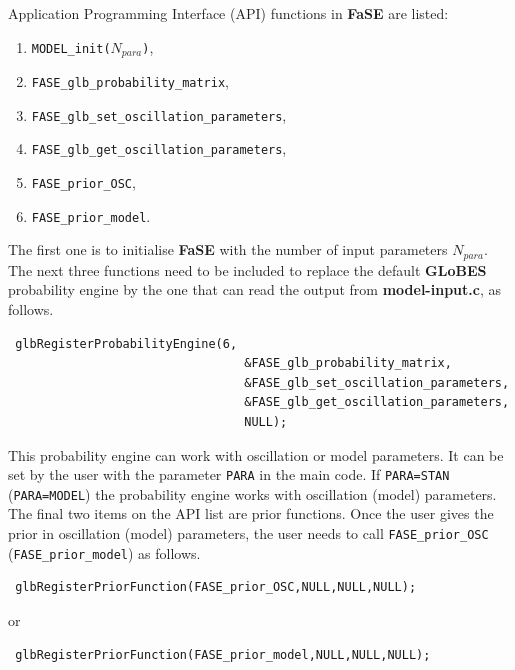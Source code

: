 \documentclass[aps,prd,nofootinbib,preprint]{revtex4}
\begin{document}
Application Programming Interface (API) functions in \textbf{FaSE} are listed:
\begin{enumerate}
\item \texttt{MODEL\_init($N_{para}$)},
\item  \texttt{FASE\_glb\_probability\_matrix},
\item  \texttt{FASE\_glb\_set\_oscillation\_parameters},
\item  \texttt{FASE\_glb\_get\_oscillation\_parameters},
\item \texttt{FASE\_prior\_OSC},
\item \texttt{FASE\_prior\_model}.
\end{enumerate}
The first one is to initialise \textbf{FaSE} with the number of input parameters $N_{para}$. The next three functions need to be included to replace the default \textbf{GLoBES} probability engine by the one that can read the output from \textbf{model-input.c}, as follows.
\begin{verbatim}
 glbRegisterProbabilityEngine(6,
                                 &FASE_glb_probability_matrix,
                                 &FASE_glb_set_oscillation_parameters,
                                 &FASE_glb_get_oscillation_parameters,
                                 NULL);
\end{verbatim}

This probability engine can work with oscillation or model parameters. It can be set by the user with the parameter \texttt{PARA} in the main code. If \texttt{PARA=STAN} (\texttt{PARA=MODEL}) the probability engine works with oscillation (model) parameters. The final two items on the API list are prior functions. Once the user gives the prior in oscillation (model) parameters, the user needs to call \texttt{FASE\_prior\_OSC} (\texttt{FASE\_prior\_model}) as follows.
\begin{verbatim}
 glbRegisterPriorFunction(FASE_prior_OSC,NULL,NULL,NULL);
\end{verbatim}
or
\begin{verbatim}
 glbRegisterPriorFunction(FASE_prior_model,NULL,NULL,NULL);
\end{verbatim}
\end{document}
